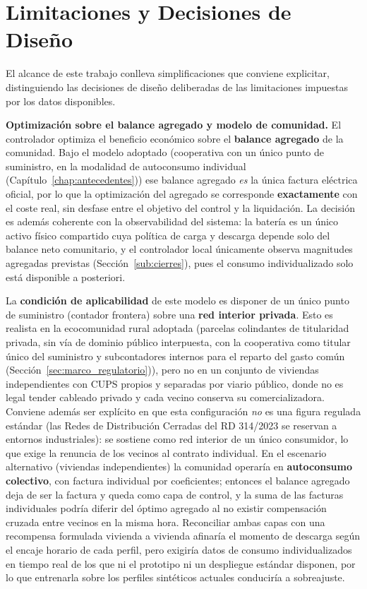 \documentclass[12pt, a4paper, twoside]{report}
\begin{document}
\section{Limitaciones y Decisiones de Diseño}
\label{sec:limitaciones}

El alcance de este trabajo conlleva simplificaciones que conviene explicitar,
distinguiendo las decisiones de diseño deliberadas de las limitaciones impuestas
por los datos disponibles.

\textbf{Optimización sobre el balance agregado y modelo de comunidad.} El
controlador optimiza el beneficio económico sobre el \textbf{balance agregado} de
la comunidad. Bajo el modelo adoptado (cooperativa con un único punto de
suministro, en la modalidad de autoconsumo individual
(Capítulo~\ref{chap:antecedentes})) ese balance agregado \emph{es} la única
factura eléctrica oficial, por lo que la optimización del agregado se corresponde
\textbf{exactamente} con el coste real, sin desfase entre el objetivo del control
y la liquidación. La decisión es además coherente con la observabilidad del
sistema: la batería es un único activo físico compartido cuya política de carga y
descarga depende solo del balance neto comunitario, y el controlador local
únicamente observa magnitudes agregadas previstas (Sección~\ref{sub:cierres}),
pues el consumo individualizado solo está disponible a posteriori.

La \textbf{condición de aplicabilidad} de este modelo es disponer de un único
punto de suministro (contador frontera) sobre una \textbf{red interior privada}.
Esto es realista en la ecocomunidad rural adoptada (parcelas colindantes de
titularidad privada, sin vía de dominio público interpuesta, con la cooperativa
como titular único del suministro y subcontadores internos para el reparto del
gasto común (Sección~\ref{sec:marco_regulatorio})), pero no en un conjunto de
viviendas independientes con CUPS propios y separadas por viario público, donde
no es legal tender cableado privado y cada vecino conserva su comercializadora.
Conviene además ser explícito en que esta configuración \emph{no} es una figura
regulada estándar (las Redes de Distribución Cerradas del RD 314/2023 se
reservan a entornos industriales): se sostiene como red interior de un
único consumidor, lo que exige la renuncia de los vecinos al contrato individual.
En el escenario alternativo (viviendas independientes) la comunidad operaría en
\textbf{autoconsumo colectivo}, con factura individual por coeficientes; entonces
el balance agregado deja de ser la factura y queda como capa de control, y la suma
de las facturas individuales podría diferir del óptimo agregado al no existir
compensación cruzada entre vecinos en la misma hora.
Reconciliar ambas capas con una recompensa formulada vivienda a vivienda afinaría
el momento de descarga según el encaje horario de cada perfil, pero exigiría
datos de consumo individualizados en tiempo real de los que ni el prototipo ni un
despliegue estándar disponen, por lo que entrenarla sobre los perfiles sintéticos
actuales conduciría a sobreajuste.
\end{document}
